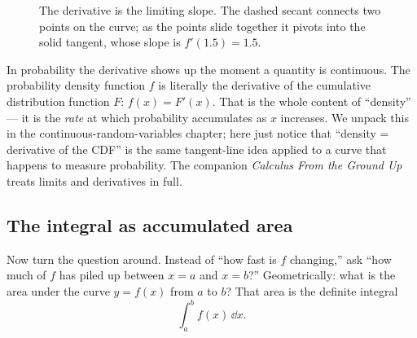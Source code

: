 \begin{figure}[H]
\centering
{}
\caption{The derivative is the limiting slope. The dashed secant connects two points on the curve; as
the points slide together it pivots into the solid tangent, whose slope is $f'(1.5)=1.5$.}
\label{chAcla:fig-tangent}
\end{figure}

\begin{connectionbox}
In probability the derivative shows up the moment a quantity is continuous. The probability density
function $f$ is literally the derivative of the cumulative distribution function $F$: $f(x)=F'(x)$.
That is the whole content of ``density'' --- it is the \emph{rate} at which probability accumulates as
$x$ increases. We unpack this in the continuous-random-variables chapter; here just notice that
``density = derivative of the CDF'' is the same tangent-line idea applied to a curve that happens to
measure probability. The companion \emph{Calculus From the Ground Up} treats limits and derivatives in
full.
\end{connectionbox}

\subsection{The integral as accumulated area}
\label{chAcla:integral}

Now turn the question around. Instead of ``how fast is $f$ changing,'' ask ``how much of $f$ has
piled up between $x=a$ and $x=b$?'' Geometrically: what is the area under the curve $y=f(x)$ from $a$
to $b$? That area is the definite integral
\[
  \int_a^b f(x)\,\dd x.
\]

